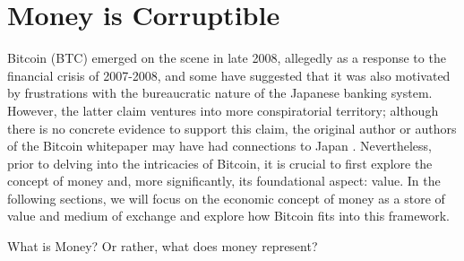 \section{Money is Corruptible}
Bitcoin (BTC) emerged on the scene in late 2008, allegedly as a response to the financial crisis of 2007-2008, and some
have suggested that it was also motivated by frustrations with the bureaucratic nature of the Japanese banking system.
However, the latter claim ventures into more conspiratorial territory; although there is no concrete evidence to support
this claim, the original author or authors of the Bitcoin whitepaper may have had connections to Japan
\cite{nakamoto2008bitcoin}. Nevertheless, prior to delving into the intricacies of Bitcoin, it is crucial to first
explore the concept of money and, more significantly, its foundational aspect: value. In the following sections, we will
focus on the economic concept of money as a store of value and medium of exchange and explore how Bitcoin fits into this
framework.

What is Money? Or rather, what does money represent?



